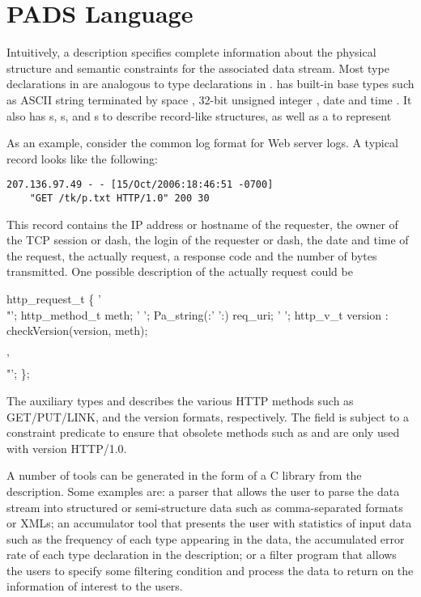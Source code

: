 \documentclass{article}
\begin{document}
\section{PADS Language}
Intuitively, a \padsc{} description specifies complete information
about the physical structure and semantic constraints for the associated
data stream. Most type declarations in \padsc{} are analogous to type
declarations in \C{}. \padsc{} has built-in base types such as
ASCII string terminated by space ,
32-bit unsigned integer , date  and time .
It also has s, s, and s to describe
record-like structures, as well as a  to represent

As an example, consider the common log format for Web server logs.  A
typical record looks like the following:
{\small \begin{verbatim}
207.136.97.49 - - [15/Oct/2006:18:46:51 -0700] 
	"GET /tk/p.txt HTTP/1.0" 200 30
\end{verbatim}
}

This record contains the IP address or hostname of the requester, the owner of
the TCP session or dash, the login of the requester or dash, the date and time of 
the request, the actually request, a response code and the number of bytes transmitted.
One possible \padsc{} description of the actually request could be
\begin{code}
 http_request_t \{
  '\\"'; http_method_t    meth;           
  ' ';  Pa_string(:' ':) req_uri;        
  ' ';  http_v_t version : 
	checkVersion(version, meth);
                                         
  '\\"';
\};
\end{code}

The auxiliary types  and  describes the various
HTTP methods such as GET/PUT/LINK, and the version formats, respectively.
The  field is subject to a constraint predicate 
to ensure that obsolete methods such as  and  are only
used with version HTTP/1.0.

A number of tools can be generated in the form of a C library from the
\padsc{} description. Some examples are: a parser that allows the user to
parse the data stream into structured or semi-structure data such as
comma-separated formats or XMLs; an accumulator tool that presents the user with 
statistics of input data such as the frequency of each type appearing in
the data, the accumulated error rate of each type declaration in the
\padsc{} description; or a filter program that allows the users to specify
some filtering condition and process the data to return on the information
of interest to the users. 
\end{document}
